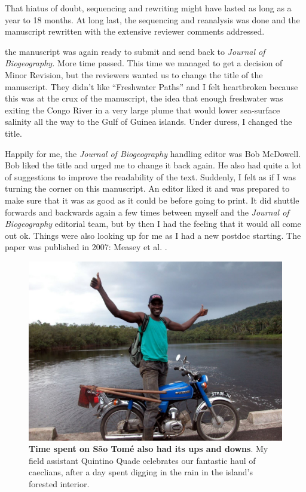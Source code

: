 \documentclass[
]{krantz}
\begin{document}
That hiatus of doubt, sequencing and rewriting might have lasted as long as a year to 18 months. At long last, the sequencing and reanalysis was done and the manuscript rewritten with the extensive reviewer comments addressed.

the manuscript was again ready to submit and send back to \emph{Journal of Biogeography.} More time passed. This time we managed to get a decision of Minor Revision, but the reviewers wanted us to change the title of the manuscript. They didn't like ``Freshwater Paths'' and I felt heartbroken because this was at the crux of the manuscript, the idea that enough freshwater was exiting the Congo River in a very large plume that would lower sea-surface salinity all the way to the Gulf of Guinea islands. Under duress, I changed the title.

Happily for me, the \emph{Journal of Biogeography} handling editor was Bob McDowell. Bob liked the title and urged me to change it back again. He also had quite a lot of suggestions to improve the readability of the text. Suddenly, I felt as if I was turning the corner on this manuscript. An editor liked it and was prepared to make sure that it was as good as it could be before going to print. It did shuttle forwards and backwards again a few times between myself and the \emph{Journal of Biogeography} editorial team, but by then I had the feeling that it would all come out ok. Things were also looking up for me as I had a new postdoc starting. The paper was published in 2007: Measey et al. \citeyearpar{measey2007freshwater}.



\begin{figure}
\includegraphics[width=0.85\linewidth]{figures/Dscn4787} \caption{\textbf{Time spent on São Tomé also had its ups and downs}. My field assistant Quintino Quade celebrates our fantastic haul of caeclians, after a day spent digging in the rain in the island's forested interior.}\label{fig:celebrate}
\end{figure}
\end{document}
